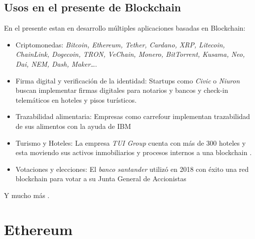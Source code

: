 \subsection{Usos en el presente de Blockchain}
En el presente estan en desarrollo múltiples aplicaciones basadas en Blockchain:

\begin{itemize}
\item Criptomonedas: \emph{Bitcoin, Ethereum, Tether, Cardano, XRP, Litecoin, ChainLink, Dogecoin, TRON, VeChain, Monero, BitTorrent, Kusama, Neo, Dai, NEM, Dash, Maker}\dots \cite{listaCripto}.
\item Firma digital y verificación de la identidad: Startups como \emph{Civic} o \emph{Niuron}\cite{civic, niuron} buscan implementar firmas digitales para notarios y bancos y check-in telemáticos en hoteles y pisos turísticos.
\item Trazabilidad alimentaria: Empresas como carrefour implementan trazabilidad de sus alimentos con la ayuda de IBM \cite{carrefour}
\item Turismo y Hoteles: La empresa \emph{TUI Group} cuenta con más de 300 hoteles y esta moviendo sus activos inmobiliarios y procesos internos a una blockchain \cite{tuig}.
\item Votaciones y elecciones: El \emph{banco santander} utilizó en 2018 con éxito una red blockchain para votar a su Junta General de Accionistas\cite{santanderVotacion}
\end{itemize}

Y mucho más \cite{appCripto}.

\section{Ethereum}

